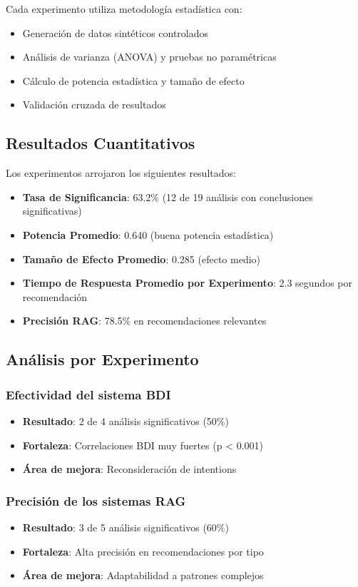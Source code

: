 \documentclass[runningheads,a4paper]{llncs}
\begin{document}
Cada experimento utiliza metodología estadística con:
\begin{itemize}
    \item Generación de datos sintéticos controlados
    \item Análisis de varianza (ANOVA) y pruebas no paramétricas
    \item Cálculo de potencia estadística y tamaño de efecto
    \item Validación cruzada de resultados
\end{itemize}

\subsection{Resultados Cuantitativos}

Los experimentos arrojaron los siguientes resultados:

\begin{itemize}
    \item \textbf{Tasa de Significancia}: 63.2\% (12 de 19 análisis con conclusiones significativas)
    \item \textbf{Potencia Promedio}: 0.640 (buena potencia estadística)
    \item \textbf{Tamaño de Efecto Promedio}: 0.285 (efecto medio)
    \item \textbf{Tiempo de Respuesta Promedio por Experimento}: 2.3 segundos por recomendación
    \item \textbf{Precisión RAG}: 78.5\% en recomendaciones relevantes
\end{itemize}

\subsection{Análisis por Experimento}

\subsubsection{Efectividad del sistema BDI}
\begin{itemize}
    \item \textbf{Resultado}: 2 de 4 análisis significativos (50\%)
    \item \textbf{Fortaleza}: Correlaciones BDI muy fuertes (p < 0.001)
    \item \textbf{Área de mejora}: Reconsideración de intentions
\end{itemize}

\subsubsection{Precisión de los sistemas RAG}
\begin{itemize}
    \item \textbf{Resultado}: 3 de 5 análisis significativos (60\%)
    \item \textbf{Fortaleza}: Alta precisión en recomendaciones por tipo
    \item \textbf{Área de mejora}: Adaptabilidad a patrones complejos
\end{itemize}
\end{document}
